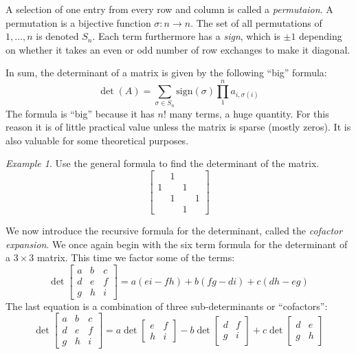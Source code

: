 \documentclass[11pt,oneside]{amsbook}
\theoremstyle{definition}
\theoremstyle{plain}
\theoremstyle{definition}
\theoremstyle{remark}
\newtheorem{example}[theorem]{Example}
\numberwithin{equation}{section}
\numberwithin{figure}{section}
\begin{document}
\normalsize
A selection of one entry from every row and column is called a \emph{permutaion}. A permutation is a bijective function $\sigma\colon n\to n$. The set of all permutations of $1,\ldots,n$ is denoted $S_n$. Each term furthermore has a \emph{sign}, which is $\pm1$ depending on whether it takes an even or odd number of row exchanges to make it diagonal.

In sum, the determinant of a matrix is given by the following ``big'' formula:
\[\det(A)=
  \sum_{\sigma\in S_n}\mathrm{sign}(\sigma)\prod_1^na_{i,\sigma(i)}
\]
The formula is ``big'' because it has $n!$ many terms, a huge quantity. For this reason it is of little practical value unless the matrix is sparse (mostly zeros). It is also valuable for some theoretical purposes.

\begin{example}
  Use the general formula to find the determinant of the matrix.
  \[\begin{bmatrix}&1&&\\1&&1\\&1&&1\\&&1\end{bmatrix}
  \]
\end{example}

We now introduce the recursive formula for the determinant, called the \emph{cofactor expansion}. We once again begin with the six term formula for the determinant of a $3\times3$ matrix. This time we factor some of the terms:
\[\det\begin{bmatrix}a&b&c\\d&e&f\\g&h&i\end{bmatrix}
  =a(ei-fh)+b(fg-di)+c(dh-eg)
\]
The last equation is a combination of three sub-determinants or ``cofactors'':
\[\det\begin{bmatrix}a&b&c\\d&e&f\\g&h&i\end{bmatrix}
  =a\det\begin{bmatrix}e&f\\h&i\end{bmatrix}
  -b\det\begin{bmatrix}d&f\\g&i\end{bmatrix}
  +c\det\begin{bmatrix}d&e\\g&h\end{bmatrix}
\]
\end{document}
